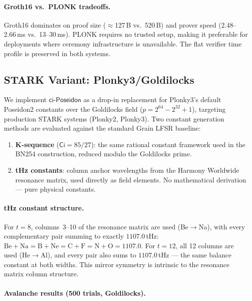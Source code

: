 \documentclass[preprint]{iacrtrans}
\newcommand{\Ci}{\ensuremath{\mathsf{Ci}}}
\newcommand{\ciposeidon}{\ensuremath{\mathsf{ci\text{-}Poseidon}}}
\begin{document}
\paragraph{Groth16 vs.\ PLONK tradeoffs.} Groth16 dominates on proof size
($\approx$127\,B vs.\ 520\,B) and prover speed (2.48--2.66\,ms vs.\
13--30\,ms). PLONK requires no trusted setup, making it preferable for
deployments where ceremony infrastructure is unavailable. The flat verifier
time profile is preserved in both systems.

\subsection{STARK Variant: Plonky3/Goldilocks}

We implement \ciposeidon{} as a drop-in replacement for Plonky3's default
Poseidon2 constants over the Goldilocks field ($p = 2^{64} - 2^{32} + 1$),
targeting production STARK systems (Plonky2, Plonky3). Two constant generation
methods are evaluated against the standard Grain LFSR baseline:

\begin{enumerate}
  \item \textbf{K-sequence} ($\Ci = 85/27$): the same rational constant
    framework used in the BN254 construction, reduced modulo the Goldilocks
    prime.
  \item \textbf{tHz constants}: column anchor wavelengths from the Harmony
    Worldwide resonance matrix, used directly as field elements. No
    mathematical derivation — pure physical constants.
\end{enumerate}

\paragraph{tHz constant structure.}
For $t=8$, columns~3--10 of the resonance matrix are used (Be$\to$Na),
with every complementary pair summing to exactly $1107.0$\,tHz:
$\text{Be}+\text{Na} = \text{B}+\text{Ne} = \text{C}+\text{F} = \text{N}+\text{O} = 1107.0$.
For $t=12$, all 12 columns are used (He$\to$Al), and every pair also sums
to $1107.0$\,tHz — the same balance constant at both widths. This mirror
symmetry is intrinsic to the resonance matrix column structure.

\paragraph{Avalanche results (500 trials, Goldilocks).}
\end{document}
